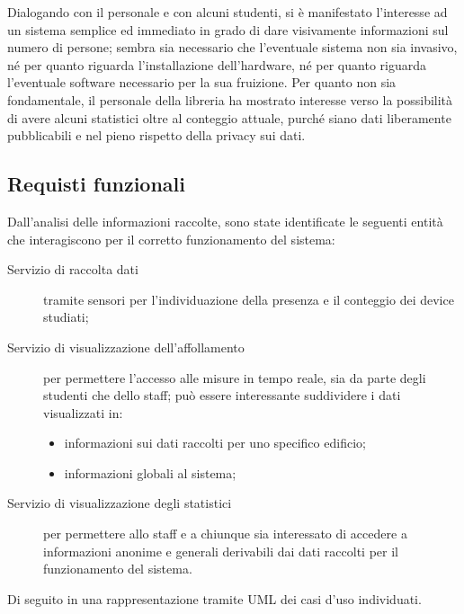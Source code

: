 Dialogando con il personale e con alcuni studenti, si è manifestato l'interesse ad un sistema semplice ed immediato in grado di dare visivamente informazioni sul numero di persone;
sembra sia necessario che l'eventuale sistema non sia invasivo, né per quanto riguarda l'installazione dell'hardware, né per quanto riguarda l'eventuale software necessario per la sua fruizione.
Per quanto non sia fondamentale, il personale della libreria ha mostrato interesse verso la possibilità di avere alcuni statistici oltre al conteggio attuale, purché siano dati liberamente pubblicabili e nel pieno rispetto della privacy sui dati.

\subsection{Requisti funzionali}\label{subsec:req:func}

Dall'analisi delle informazioni raccolte, sono state identificate le seguenti entità che interagiscono per il corretto funzionamento del sistema:

\begin{description}
    \item[Servizio di raccolta dati]
      tramite sensori per l'individuazione della presenza e il conteggio dei device studiati;
    \item[Servizio di visualizzazione dell'affollamento]
      per permettere l'accesso alle misure in tempo reale, sia da parte degli studenti che dello staff;
      può essere interessante suddividere i dati visualizzati in:
      \begin{itemize}
        \item informazioni sui dati raccolti per uno specifico edificio;
        \item informazioni globali al sistema;
      \end{itemize}
    \item[Servizio di visualizzazione degli statistici]
      per permettere allo staff e a chiunque sia interessato di accedere a informazioni anonime e generali
      derivabili dai dati raccolti per il funzionamento del sistema.
\end{description}

Di seguito in  una rappresentazione tramite UML dei casi d'uso individuati.

